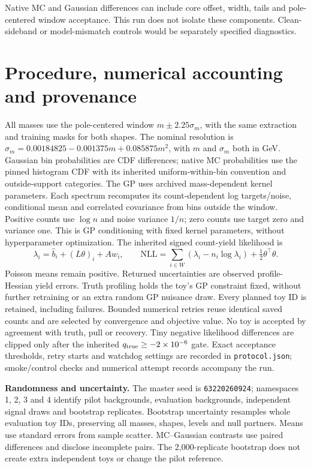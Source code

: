 \documentclass[10pt]{article}
\begin{document}
Native MC and Gaussian differences can include core offset, width, tails and pole-centered window acceptance. This run does not isolate these components. Clean-sideband or model-mismatch controls would be separately specified diagnostics.
\clearpage\section*{Procedure, numerical accounting and provenance}
All masses use the pole-centered window $m\pm2.25\sigma_m$, with the same extraction and training masks for both shapes. The nominal resolution is $\sigma_m=0.00184825-0.001375m+0.085875m^2$, with $m$ and $\sigma_m$ both in GeV. Gaussian bin probabilities are CDF differences; native MC probabilities use the pinned histogram CDF with its inherited uniform-within-bin convention and outside-support categories.
The GP uses archived mass-dependent kernel parameters. Each spectrum recomputes its count-dependent log targets/noise, conditional mean and correlated covariance from bins outside the window. Positive counts use $\log n$ and noise variance $1/n$; zero counts use target zero and variance one. This is GP conditioning with fixed kernel parameters, without hyperparameter optimization. The inherited signed count-yield likelihood is\[\lambda_i=\widehat b_i+(L\theta)_i+A w_i,\qquad\mathrm{NLL}=\sum_{i\in W}(\lambda_i-n_i\log\lambda_i)+\tfrac12\theta^\top\theta.\]Poisson means remain positive. Returned uncertainties are observed profile-Hessian yield errors. Truth profiling holds the toy's GP constraint fixed, without further retraining or an extra random GP nuisance draw.
Every planned toy ID is retained, including failures. Bounded numerical retries reuse identical saved counts and are selected by convergence and objective value. No toy is accepted by agreement with truth, pull or recovery. Tiny negative likelihood differences are clipped only after the inherited $q_{\rm true}\geq-2\times10^{-6}$ gate. Exact acceptance thresholds, retry starts and watchdog settings are recorded in \texttt{protocol.json}; smoke/control checks and numerical attempt records accompany the run.
\par\textbf{Randomness and uncertainty.} The master seed is \texttt{63220260924}; namespaces 1, 2, 3 and 4 identify pilot backgrounds, evaluation backgrounds, independent signal draws and bootstrap replicates. Bootstrap uncertainty resamples whole evaluation toy IDs, preserving all masses, shapes, levels and null partners. Means use standard errors from sample scatter. MC--Gaussian contrasts use paired differences and disclose incomplete pairs. The 2,000-replicate bootstrap does not create extra independent toys or change the pilot reference.
\end{document}
